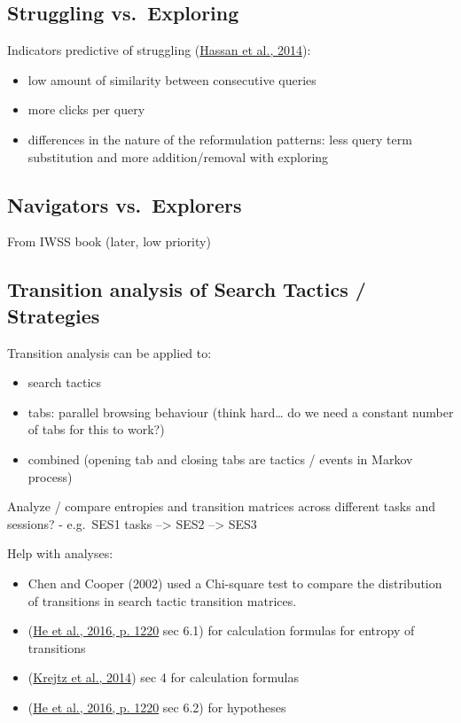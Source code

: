 \documentclass[letterpaper, nobind]{templates/ociamthesis}
\providecommand{\tightlist}{%
  \setlength{\itemsep}{0pt}\setlength{\parskip}{0pt}}
\begin{document}
\hypertarget{struggling-vs.-exploring}{%
\subsection{Struggling vs.~Exploring}\label{struggling-vs.-exploring}}

Indicators predictive of struggling (\protect\hyperlink{ref-hassan2014struggling}{Hassan et al., 2014}):

\begin{itemize}
\tightlist
\item
  low amount of similarity between consecutive queries
\item
  more clicks per query
\item
  differences in the nature of the reformulation patterns: less query term substitution and more addition/removal with exploring
\end{itemize}

\hypertarget{navigators-vs.-explorers}{%
\subsection{Navigators vs.~Explorers}\label{navigators-vs.-explorers}}

From IWSS book
(later, low priority)

\hypertarget{transition-analysis-of-search-tactics-strategies}{%
\subsection{Transition analysis of Search Tactics / Strategies}\label{transition-analysis-of-search-tactics-strategies}}

Transition analysis can be applied to:

\begin{itemize}
\tightlist
\item
  search tactics
\item
  tabs: parallel browsing behaviour (think hard\ldots{} do we need a constant number of tabs for this to work?)
\item
  combined (opening tab and closing tabs are tactics / events in Markov process)
\end{itemize}

Analyze / compare entropies and transition matrices across different tasks and sessions?
- e.g.~SES1 tasks --\textgreater{} SES2 --\textgreater{} SES3

Help with analyses:

\begin{itemize}
\tightlist
\item
  Chen and Cooper (2002) used a Chi-square test to compare the distribution of transitions in search tactic transition matrices.
\item
  (\protect\hyperlink{ref-he2016beyond}{He et al., 2016, p. 1220} sec 6.1) for calculation formulas for entropy of transitions
\item
  (\protect\hyperlink{ref-krejtz2014entropy}{Krejtz et al., 2014}) sec 4 for calculation formulas
\item
  (\protect\hyperlink{ref-he2016beyond}{He et al., 2016, p. 1220} sec 6.2) for hypotheses
\end{itemize}
\end{document}
